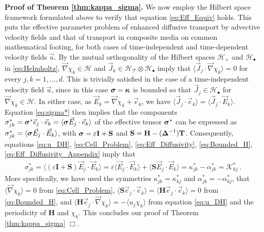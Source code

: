 \documentclass[11pt]{amsart}
\newcommand{\Tb}{\mathbf{T}}
\newcommand{\Hb}{\mathbf{H}}
\newcommand{\Ib}{\mathbf{I}}
\newcommand{\Sb}{\mathbf{S}}
\newcommand{\Kc}{\mathcal{K}}
\newcommand{\Tc}{\mathcal{T}}
\newcommand{\Hs}{\mathscr{H}}
\newcommand\bsig{\mbox{\boldmath${\sigma}$}}
\newcommand\bDelta{\mbox{\boldmath${\Delta}$}}
\newcommand\bkappa{\mbox{\boldmath${\kappa}$}}
\begin{document}
\textbf{Proof of Theorem \ref{thm:kappa_sigma}.}\hspace{1ex}
We now employ the Hilbert space framework formulated above to verify
that equation \eqref{eq:Eff_Equiv} holds. This puts the effective
parameter problem of enhanced diffusive transport by advective
velocity fields and that of transport in composite media on common
mathematical footing, for both cases of time-independent and
time-dependent velocity fields $\vec{u}$. By the mutual orthogonality
of the Hilbert spaces $\Hs_\times$ and $\Hs_\bullet$ in \eqref{eq:Helmholtz},
$\vec{\nabla}\chi_k\in\Hs$ and $\vec{J}_k\in\Hs_{\Tc}\otimes\Hs_\bullet$ imply that
$\langle\vec{J}_j\cdot\vec{\nabla}\chi_k\rangle=0$ for every $j,k=1,\ldots,d$. This is trivially
satisfied in the case of a time-independent velocity field $\vec{u}$,
since in this case $\bsig=\bkappa$ is bounded so that
$\vec{J}_j\in\Hs_\bullet$ for $\vec{\nabla}\chi_k\in\Hs$. In either case, as
$\vec{E}_k=\vec{\nabla}\chi_k+\vec{e}_k$, we have
$\langle\vec{J}_j\cdot\vec{e}_k\rangle=\langle\vec{J}_j\cdot\vec{E}_k\rangle$. Equation
\eqref{eq:sigma*} then implies that the components
$\sigma^*_{jk}=\bsig^*\vec{e}_j\cdot\vec{e}_k=\langle\bsig\vec{E}_j\cdot\vec{e}_k\rangle$ of
the effective tensor $\bsig^*$ can be expressed as
$\sigma^*_{jk}=\langle\bsig\vec{E}_j\cdot\vec{E}_k\rangle$, with $\bsig=\varepsilon\Ib+\Sb$ and
$\Sb=\Hb-(\bDelta^{-1})\Tb$. Consequently, equations \eqref{eq:u_DH},
\eqref{eq:Cell_Problem}, \eqref{eq:Eff_Diffusivity},
\eqref{eq:Bounded_H}, \eqref{eq:Eff_Diffusivity_Appendix} 
imply that     
%
\begin{align}\label{eq:Reduction}
  \sigma^*_{jk}%
       =\langle(\varepsilon\Ib+\Sb)\vec{E}_j\cdot\vec{E}_k\rangle
       =\varepsilon\langle\vec{E}_j\cdot\vec{E}_k\rangle+\langle\Sb\vec{E}_j\cdot\vec{E}_k\rangle
       =\kappa^*_{jk}-\alpha^*_{jk}
       =\Kc_{kj}^*\,.       
\end{align}
%
More specifically, we have used the symmetries $\kappa^*_{jk}=\kappa^*_{kj}$ and
$\alpha^*_{jk}=-\alpha^*_{kj}$, that $\langle\vec{\nabla}\chi_k\rangle=0$ from \eqref{eq:Cell_Problem},
$\langle\Sb\vec{e}_j\cdot\vec{e}_k\rangle=\langle\Hb\vec{e}_j\cdot\vec{e}_k\rangle=0$ from
\eqref{eq:Bounded_H}, and $\langle\Hb\vec{e}_j\cdot\vec{\nabla}\chi_k\rangle=-\langle u_j\chi_k\rangle$
from equation \eqref{eq:u_DH} and the periodicity of $\Hb$ and $\chi_k$.  
This concludes our proof of Theorem \ref{thm:kappa_sigma} $\Box$.    
\end{document}
